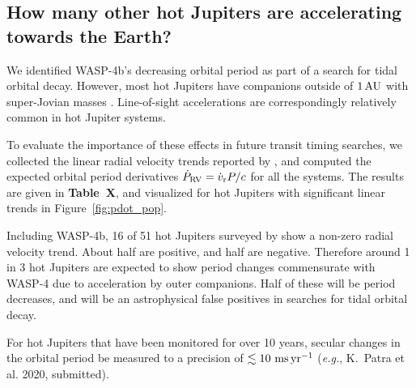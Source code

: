 \documentclass[12pt,twocolumn,tighten]{aastex62}
\begin{document}

\subsection{How many other hot Jupiters are accelerating towards the
Earth?}

We identified WASP-4b's decreasing orbital period as part of a search
for tidal orbital decay.  However, most hot Jupiters have companions
outside of $1\,{\rm AU}$ with super-Jovian masses
\citep{knutson_friends_2014}.  Line-of-sight accelerations are
correspondingly relatively common in hot Jupiter systems. 

To evaluate the importance of these effects in future transit timing
searches, we collected the linear radial velocity trends reported by
\citet{knutson_friends_2014}, and computed the expected orbital period
derivatives $\dot{P}_{\rm RV} = \dot{v}_{\rm r} P/c$ for all the
systems.  The results are given in {\bf Table~X}, and visualized for
hot Jupiters with significant linear trends in
Figure~\ref{fig:pdot_pop}.

Including WASP-4b, 16 of 51 hot Jupiters surveyed by
\citet{knutson_friends_2014} show a non-zero radial velocity trend.
About half are positive, and half are negative.  Therefore around 1 in
3 hot Jupiters are expected to show period changes commensurate with
WASP-4 due to acceleration by outer companions.  Half of these will be
period decreases, and will be an astrophysical false positives in
searches for tidal orbital decay.

For hot Jupiters that have been monitored for over 10 years, secular
changes in the orbital period be measured to a precision of $\lesssim
10~{\rm ms}\,{\rm yr}^{-1}$ ({\it e.g.}, K.~Patra et al{.} 2020,
submitted).
\end{document}
